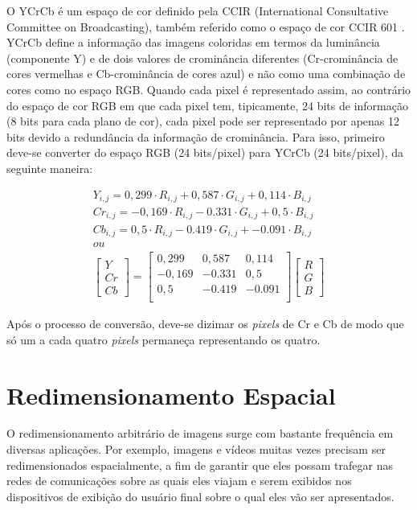 O YCrCb é um espaço de cor definido pela CCIR (International Consultative Committee on Broadcasting), também referido como o espaço de cor CCIR 601 \cite{acharya2002integrated}. YCrCb define a informação  das imagens coloridas  em termos da luminância (componente Y) e de dois valores de crominância diferentes (Cr-crominância de cores vermelhas e Cb-crominância de cores azul) e não como uma combinação de cores como no espaço RGB. Quando cada pixel é representado assim, ao contrário do espaço de cor RGB em que cada pixel tem, tipicamente, 24 bits de informação (8 bits para cada plano de cor), cada pixel pode ser representado por apenas 12 bits devido a redundância da informação de crominância. Para isso, primeiro deve-se converter do espaço RGB (24 bits/pixel) para YCrCb (24 bits/pixel), da seguinte maneira:
\begin{center}
	\begin{equation}
	\begin{split}
	Y_{i,j} = 0,299\cdot R_{i,j} + 0,587\cdot G_{i,j} + 0,114\cdot B_{i,j}\\
	Cr_{i,j} = -0,169\cdot R_{i,j} -0.331\cdot G_{i,j} + 0,5\cdot B_{i,j}\\
	Cb_{i,j} = 0,5\cdot R_{i,j} -0.419\cdot G_{i,j} + -0.091\cdot B_{i,j}\\
	ou \\
	\begin{bmatrix}		
	Y\\ Cr \\ Cb
	\end{bmatrix}
	 = 
	\begin{bmatrix}
  		0,299 & 0,587 &  0,114 \\
  		-0,169 &-0.331 & 0,5 \\
  		0,5  & -0.419  & -0.091\\
	\end{bmatrix}
	\begin{bmatrix}
	R\\ G \\ B
	\end{bmatrix}
	\label{rgb2yuv} 
	\end{split}
	\end{equation}

\end{center}

\noindent Após o processo de conversão, deve-se dizimar os \textit{pixels} de Cr e Cb de modo que só um a cada quatro \textit{pixels} permaneça representando os quatro.

\section{Redimensionamento Espacial}
 \label{DCT}
O redimensionamento arbitrário de imagens surge com bastante frequência em diversas aplicações. Por exemplo, imagens e vídeos muitas vezes precisam ser redimensionados espacialmente, a fim de garantir que eles possam trafegar nas redes de comunicações sobre as quais eles viajam e serem exibidos nos dispositivos de exibição do usuário final sobre o qual eles vão ser apresentados. \cite{salazar2007complexity}
 
